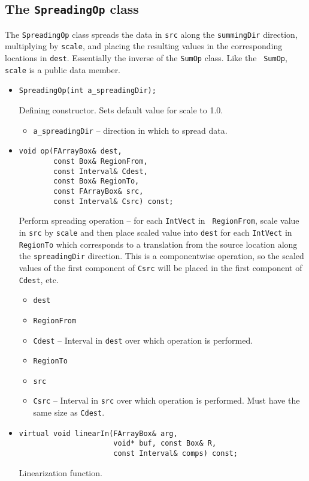 \subsection{The {\tt SpreadingOp} class}
The {\tt SpreadingOp} class spreads the data in {\tt src} along the
{\tt summingDir} direction, multiplying by {\tt scale}, and placing
the resulting values in the corresponding locations in {\tt dest}.
Essentially the inverse of the {\tt SumOp} class.  Like the {\tt
  SumOp}, {\tt scale} is a public data member. 
\begin{itemize}
\item
\begin{verbatim}
SpreadingOp(int a_spreadingDir);
\end{verbatim}
Defining constructor.  Sets default value for scale to 1.0.
\begin{itemize}
\item \verb/a_spreadingDir/ -- direction in which to spread data.
\end{itemize}

\item
\begin{verbatim}
void op(FArrayBox& dest,
        const Box& RegionFrom,
        const Interval& Cdest,
        const Box& RegionTo,
        const FArrayBox& src,
        const Interval& Csrc) const;
\end{verbatim}
Perform spreading operation -- for each {\tt IntVect} in {\tt
  RegionFrom}, scale value in {\tt src} by {\tt scale} and then place
  scaled value into {\tt dest} for each {\tt IntVect} in {\tt
  RegionTo} which corresponds to a translation from the source
  location along the {\tt spreadingDir} direction. This is a
  componentwise operation, so the scaled values of the first component
  of {\tt Csrc} will be placed in the first component of {\tt Cdest},
  etc. 
\begin{itemize}
\item \verb/dest/
\item \verb/RegionFrom/
\item \verb/Cdest/ -- Interval in {\tt dest} over which operation is
  performed. 
\item \verb/RegionTo/ 
\item \verb/src/
\item \verb/Csrc/ -- Interval in {\tt src} over which operation is
  performed. Must have the same size as {\tt Cdest}.
\end{itemize}

\item
\begin{verbatim}
virtual void linearIn(FArrayBox& arg,  
                      void* buf, const Box& R,
                      const Interval& comps) const;
\end{verbatim}
Linearization function.

\end{itemize}

